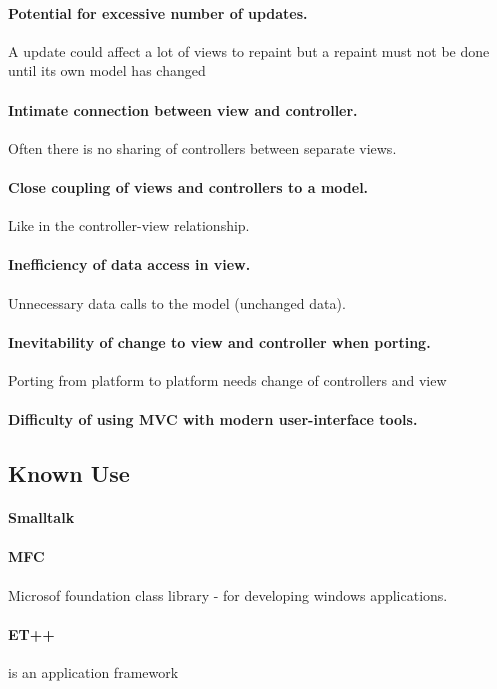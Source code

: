 \documentclass[a4paper,11pt,twocolumn]{report}
\begin{document}
    \paragraph{Potential for excessive number of updates.} A update could
    affect a lot of views to repaint but a repaint must not be done until its
    own model has changed
    \paragraph{Intimate connection between view and controller.} Often there is
    no sharing of controllers between separate views.
    \paragraph{Close coupling of views and controllers to a model.} Like in the
    controller-view relationship.
    \paragraph{Inefficiency of data access in view.} Unnecessary data calls to
    the model (unchanged data).
    \paragraph{Inevitability of change to view and controller when porting.}
    Porting from platform to platform needs change of controllers and view
    \paragraph{Difficulty of using MVC with modern user-interface tools.} 
    \subsection{Known Use}
    \paragraph{Smalltalk}
    \paragraph{MFC} Microsof foundation class library - for developing windows
    applications.
    \paragraph{ET++} is an application framework
\end{document}
